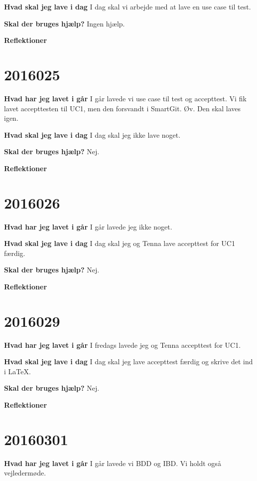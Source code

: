 \documentclass{article}
\begin{document}
	\textbf{Hvad skal jeg lave i dag}
	\subitem I dag skal vi arbejde med at lave en use case til test. 	 
	
	\textbf{Skal der bruges hjælp?}
	\subitem Ingen hjælp. 
	
	\textbf{Reflektioner}
	
	\section{2016025}
	
	\textbf{Hvad har jeg lavet i går}
	I går lavede vi use case til test og accepttest. Vi fik lavet accepttesten til UC1, men den forsvandt i SmartGit. Øv. Den skal laves igen. 
	
	\textbf{Hvad skal jeg lave i dag}
	I dag skal jeg ikke lave noget. 	
	
	\textbf{Skal der bruges hjælp?}
	Nej. 
	
	\textbf{Reflektioner}
	
	\section{2016026}
		
	\textbf{Hvad har jeg lavet i går}
	I går lavede jeg ikke noget. 
	
	\textbf{Hvad skal jeg lave i dag}
	I dag skal jeg og Tenna lave accepttest for UC1 færdig.  
	
	\textbf{Skal der bruges hjælp?}
	Nej. 
	
	\textbf{Reflektioner}
	
	\section{2016029}
		
	\textbf{Hvad har jeg lavet i går}
	I fredags lavede jeg og Tenna accepttest for UC1. 
		
	\textbf{Hvad skal jeg lave i dag}
	I dag skal jeg lave accepttest færdig og skrive det ind i LaTeX.  	
	
	\textbf{Skal der bruges hjælp?}
	Nej. 
		
	\textbf{Reflektioner}

	\section{20160301}

	\textbf{Hvad har jeg lavet i går}
	I går lavede vi BDD og IBD. Vi holdt også vejledermøde. 
	
\end{document}
